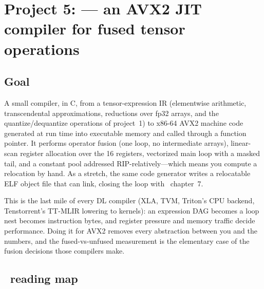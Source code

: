 \chapter{Project 5:  --- an AVX2 JIT compiler for fused tensor operations}
\label{ch:p5}

\section{Goal}

A small compiler, in C, from a tensor-expression IR (elementwise arithmetic, transcendental approximations, reductions over fp32 arrays, and the quantize/dequantize operations of project~1) to x86-64 AVX2 machine code generated at run time into executable memory and called through a function pointer. It performs operator fusion (one loop, no intermediate arrays), linear-scan register allocation over the 16  registers, vectorized main loop with a masked tail, and a constant pool addressed RIP-relatively---which means you compute a relocation by hand. As a stretch, the same code generator writes a relocatable ELF object file that  can link, closing the loop with \csapp\ chapter~7.

\begin{hook}
This is the last mile of every DL compiler (XLA, TVM, Triton's CPU backend, Tenstorrent's TT-MLIR lowering to kernels): an expression DAG becomes a loop nest becomes instruction bytes, and register pressure and memory traffic decide performance. Doing it for AVX2 removes every abstraction between you and the numbers, and the fused-vs-unfused measurement is the elementary case of the fusion decisions those compilers make.
\end{hook}

\section{\csapp\ reading map}

